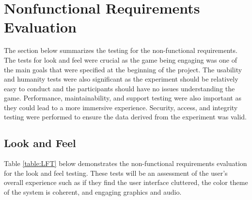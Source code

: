 \documentclass[12pt, titlepage]{article}
\begin{document}
\section{Nonfunctional Requirements Evaluation}
The section below summarizes the testing for the non-functional requirements. The tests for look and feel were crucial as the game being engaging was one of the main goals that were specified at the beginning of the project. The usability and humanity tests were also significant as the experiment should be relatively easy to conduct and the participants should have no issues understanding the game. Performance, maintainability, and support testing were also important as they could lead to a more immersive experience. Security, access, and integrity testing were performed to ensure the data derived from the experiment was valid. 
\subsection{Look and Feel}
Table \ref{table:LFT}  below demonstrates the non-functional requirements evaluation for the look and feel testing. These tests will be an assessment of the user's overall experience such as if they find the user interface cluttered, the color theme of the system is coherent, and engaging graphics and audio.
\end{document}

